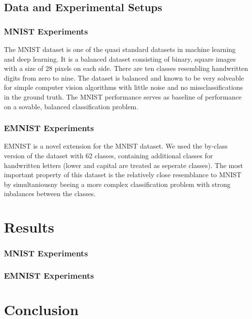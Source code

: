 \documentclass[a4paper,pt12]{article}
\begin{document}
\subsection{Data and Experimental Setups}

\subsubsection{MNIST Experiments}
The MNIST dataset is one of the quasi standard datasets in machine learning and deep learning. It is a balanced dataset consisting of binary, square images with a size of 28 pixels on each side. There are ten classes resembling handwritten digits from zero to nine. The dataset is balanced and known to be very solveable for simple computer vision algorithms with little noise and no missclassifications in the ground truth. \newline
The MNIST performance serves as baseline of performance on a sovable, balanced classification problem. 

\subsubsection{EMNIST Experiments}
EMNIST is a novel extension for the MNIST dataset. We used the by-class version of the dataset with 62 classes, containing additional classes for handwritten letters (lower and capital are treated as seperate classes). The most important property of this dataset is the relatively close resemblance to MNIST by simultaniousny beeing a more complex classification problem with strong inbalances between the classes.

\section{Results}

\subsubsection{MNIST Experiments}

\subsubsection{EMNIST Experiments}

\section{Conclusion}


%
%


\nocite{*}

\end{document}
